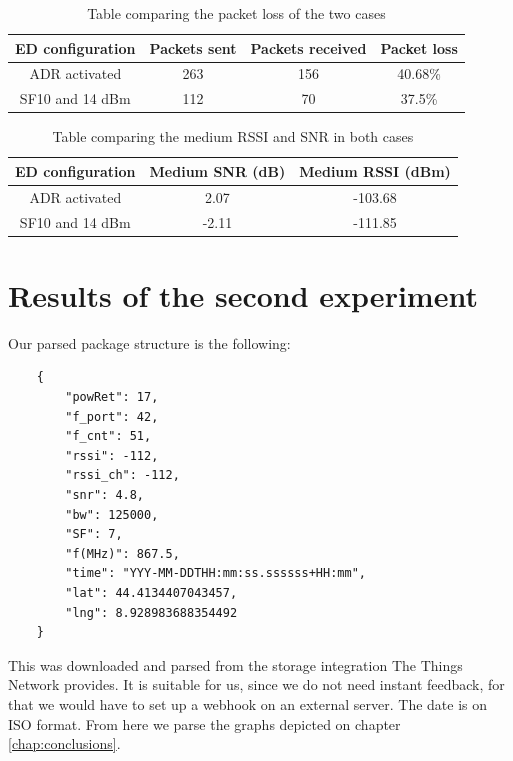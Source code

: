 \begin{table}[htpb]
    \centering
    \setlength{\arrayrulewidth}{0.5mm}
    \setlength{\tabcolsep}{18pt}
    \renewcommand{\arraystretch}{2}
    \begin{tabular}{|c|c|c|c|}
        \hline
         \cellcolor[HTML]{85C1E9}ED configuration & \cellcolor[HTML]{85C1E9}Packets sent & \cellcolor[HTML]{85C1E9}Packets received & \cellcolor[HTML]{85C1E9}Packet loss\\
         \hline
         ADR activated & 263 & 156 & 40.68\% \\
         SF10 and 14 dBm & 112 & 70 & 37.5\% \\
         \hline
    \end{tabular}
    \caption{Table comparing the packet loss of the two cases}
    \label{tab:packet_loss_exp1}
\end{table}

\begin{table}[htbp]
    \centering
    \setlength{\arrayrulewidth}{0.5mm}
    \setlength{\tabcolsep}{18pt}
    \renewcommand{\arraystretch}{2}
    \begin{tabular}{|c|c|c|}
        \hline
         \cellcolor[HTML]{85C1E9}ED configuration & \cellcolor[HTML]{85C1E9}Medium SNR (dB) & \cellcolor[HTML]{85C1E9}Medium RSSI (dBm)\\
         \hline
         ADR activated & 2.07 & -103.68 \\
         SF10 and 14 dBm & -2.11 & -111.85 \\
         \hline
    \end{tabular}
    \caption{Table comparing the medium RSSI and SNR in both cases}
    \label{tab:RSSI_SNR_exp1}
\end{table}


\section{Results of the second experiment}
Our parsed package structure is the following:\\

\begin{verbatim}
    {
        "powRet": 17,
        "f_port": 42,
        "f_cnt": 51,
        "rssi": -112,
        "rssi_ch": -112,
        "snr": 4.8,
        "bw": 125000,
        "SF": 7,
        "f(MHz)": 867.5,
        "time": "YYY-MM-DDTHH:mm:ss.ssssss+HH:mm",
        "lat": 44.4134407043457,
        "lng": 8.928983688354492
    }
\end{verbatim}
This was downloaded and parsed from the storage integration The Things Network provides.
It is suitable for us, since we do not need instant feedback, for that we would have to 
set up a webhook on an external server. The date is on ISO format. 
From here we parse the graphs depicted on chapter \ref{chap:conclusions}.

